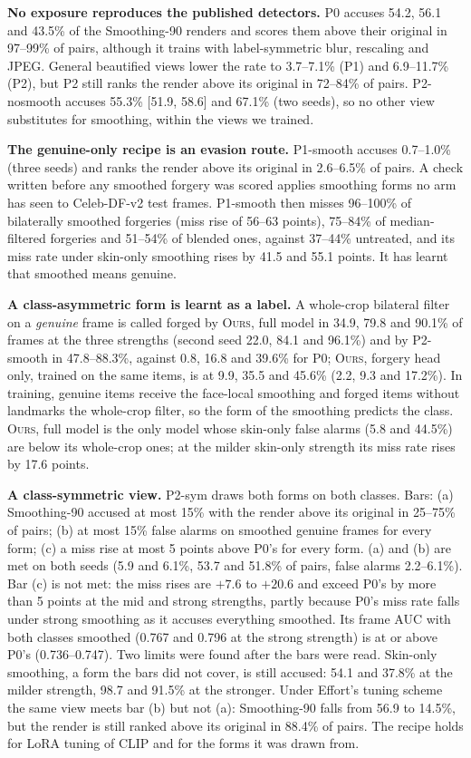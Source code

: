 \documentclass[conference]{IEEEtran}
\newcommand{\oursB}{\textsc{Ours}, forgery head only}
\newcommand{\oursF}{\textsc{Ours}, full model}
\begin{document}
\textbf{No exposure reproduces the published detectors.} P0 accuses 54.2, 56.1 and 43.5\% of the Smoothing-90 renders and
scores them above their original in 97--99\% of pairs, although it trains with label-symmetric blur, rescaling and JPEG.
General beautified views lower the rate to 3.7--7.1\% (P1) and 6.9--11.7\% (P2), but P2 still ranks the render above its
original in 72--84\% of pairs. P2-nosmooth accuses 55.3\% [51.9, 58.6] and 67.1\% (two seeds), so no other view substitutes for
smoothing, within the views we trained.

\textbf{The genuine-only recipe is an evasion route.} P1-smooth accuses 0.7--1.0\% (three seeds) and ranks the render above
its original in 2.6--6.5\% of pairs. A check written before any smoothed forgery was scored applies smoothing forms no arm has
seen to Celeb-DF-v2 test frames. P1-smooth then misses 96--100\% of bilaterally smoothed forgeries (miss rise of 56--63 points),
75--84\% of median-filtered forgeries and 51--54\% of blended ones, against 37--44\% untreated, and its miss rate under skin-only
smoothing rises by 41.5 and 55.1 points. It has learnt that smoothed means genuine.

\textbf{A class-asymmetric form is learnt as a label.} A whole-crop bilateral filter on a \emph{genuine} frame is called forged
by \oursF{} in 34.9, 79.8 and 90.1\% of frames at the three strengths (second seed 22.0, 84.1 and 96.1\%) and by P2-smooth in
47.8--88.3\%, against 0.8, 16.8 and 39.6\% for P0; \oursB{}, trained on the same items, is at 9.9, 35.5 and 45.6\% (2.2, 9.3 and
17.2\%). In training, genuine items receive the face-local smoothing and forged items without landmarks the whole-crop filter, so
the form of the smoothing predicts the class. \oursF{} is the only model whose skin-only false alarms (5.8 and 44.5\%) are below its
whole-crop ones; at the milder skin-only strength its miss rate rises by 17.6 points.

\textbf{A class-symmetric view.} P2-sym draws both forms on both classes. Bars: (a) Smoothing-90 accused at most 15\% with the
render above its original in 25--75\% of pairs; (b) at most 15\% false alarms on smoothed genuine frames for every form; (c) a miss
rise at most 5 points above P0's for every form. (a) and (b) are met on both seeds (5.9 and 6.1\%, 53.7 and 51.8\% of pairs, false
alarms 2.2--6.1\%). Bar (c) is not met: the miss rises are
$+7.6$ to $+20.6$ and exceed P0's by more than 5 points at the mid and strong strengths, partly because P0's miss rate falls under
strong smoothing as it accuses everything smoothed. Its frame AUC with both classes smoothed (0.767 and 0.796 at the strong
strength) is at or above P0's (0.736--0.747). Two limits were found after the bars were read. Skin-only smoothing, a form the bars
did not cover, is still accused: 54.1 and 37.8\% at the milder strength, 98.7 and 91.5\% at the stronger. Under Effort's tuning
scheme the same view meets bar (b) but not (a): Smoothing-90 falls from 56.9 to 14.5\%, but the render is still ranked above its
original in 88.4\% of pairs. The recipe holds for LoRA tuning of CLIP and for the forms it was drawn from.
\end{document}
